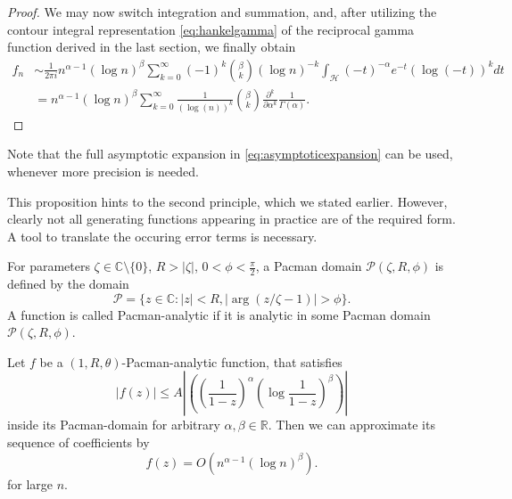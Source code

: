 \begin{proof}
We may now switch integration and summation, and, after utilizing the contour integral representation \ref{eq:hankelgamma} of the reciprocal gamma function derived in the last section, we finally obtain
\begin{align}
    f_n &\sim \frac{1}{2 \pi i} n^{\alpha - 1} (\log n)^\beta \sum_{k = 0}^\infty (-1)^k \binom{\beta}{k} (\log n)^{-k} \int_{\mathcal{H}} (-t)^{-\alpha} e^{-t} (\log(-t))^k dt \nonumber \\
    &= n^{\alpha - 1} (\log n)^\beta \sum_{k=0}^\infty \frac{1}{(\log(n))^k} \binom{\beta}{k} \frac{\partial^k}{\partial \alpha^k} \frac{1}{\Gamma(\alpha)}. \label{eq:asymptoticexpansion}
\end{align}
\end{proof}



Note that the full asymptotic expansion in \eqref{eq:asymptoticexpansion} can be used, whenever more precision is needed.

This proposition hints to the second principle, which we stated earlier. However, clearly not all generating functions appearing in practice are of the required form. A tool to translate the occuring error terms is necessary.

\begin{defn}
For parameters $\zeta \in \mathbb{C}\setminus \{0\}$, $R > |\zeta|$, $0<\phi<\frac{\pi}{2}$, a Pacman domain $\mathcal{P}(\zeta, R, \phi)$ is defined by the domain
\begin{equation*}
    \mathcal{P} = \{z \in \mathbb{C} : |z| < R, |\arg(z/\zeta - 1)| > \phi \}.
\end{equation*}
A function is called Pacman-analytic if it is analytic in some Pacman domain $\mathcal{P}(\zeta, R, \phi)$. 
\end{defn}




\begin{prop}
Let $f$ be a $(1, R, \theta)$-Pacman-analytic function, that satisfies
\begin{equation*}
    |f(z)| \leq A \left| \left( \left( \frac{1}{1-z} \right)^\alpha \left( \log \frac{1}{1-z} \right)^\beta \right) \right|
\end{equation*}
inside its Pacman-domain for arbitrary $\alpha, \beta \in \mathbb{R}$. Then we can approximate its sequence of coefficients by
\begin{equation*}
    [z^n] f(z) = O(n^{\alpha - 1} (\log n)^\beta).
\end{equation*}
for large $n$.
\end{prop}

